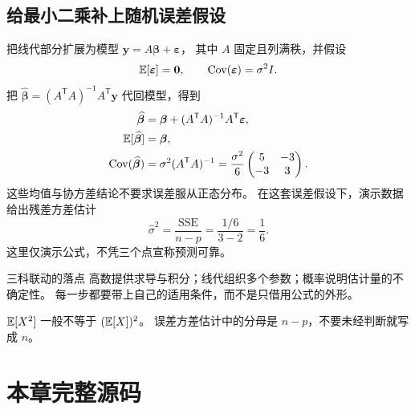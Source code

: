 \subsection{给最小二乘补上随机误差假设}
把线代部分扩展为模型 \(\bm{y}=A\bm{\beta}+\bm{\varepsilon}\)，
其中 \(A\) 固定且列满秩，并假设
\[
  \mathbb{E}[\bm{\varepsilon}]=\bm0,\qquad
  \operatorname{Cov}(\bm{\varepsilon})=\sigma^2 I.
\]
把 \(\widehat{\bm{\beta}}=(A^{\mathsf T}A)^{-1}A^{\mathsf T}\bm{y}\) 代回模型，得到
\begin{align*}
  \widehat{\bm{\beta}}
    &=\bm{\beta}+(A^{\mathsf T}A)^{-1}A^{\mathsf T}\bm{\varepsilon},\\
  \mathbb{E}[\widehat{\bm{\beta}}]&=\bm{\beta},\\
  \operatorname{Cov}(\widehat{\bm{\beta}})&=\sigma^2(A^{\mathsf T}A)^{-1}
    =\frac{\sigma^2}{6}\begin{pmatrix}5&-3\\-3&3\end{pmatrix}.
\end{align*}
这些均值与协方差结论不要求误差服从正态分布。
在这套误差假设下，演示数据给出残差方差估计
\[
  \widehat{\sigma}^2=\frac{\mathrm{SSE}}{n-p}
  =\frac{1/6}{3-2}=\frac16.
\]
这里仅演示公式，不凭三个点宣称预测可靠。

\begin{methodbox}{三科联动的落点}
高数提供求导与积分；线代组织多个参数；概率说明估计量的不确定性。
每一步都要带上自己的适用条件，而不是只借用公式的外形。
\end{methodbox}
\begin{pitfallbox}
\(\mathbb{E}[X^2]\) 一般不等于 \((\mathbb{E}[X])^2\)。
误差方差估计中的分母是 \(n-p\)，不要未经判断就写成 \(n\)。
\end{pitfallbox}

\section*{本章完整源码}
